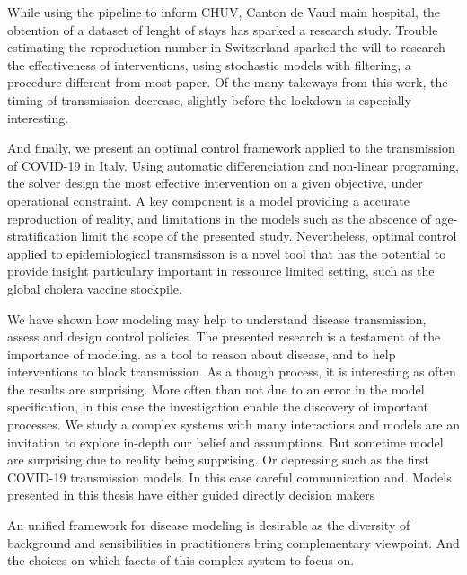 While using the pipeline to inform CHUV, Canton de Vaud main hospital, the obtention of a dataset of lenght of stays has sparked a research study. Trouble estimating the reproduction number in Switzerland sparked the will to research the effectiveness of interventions, using stochastic models with filtering, a procedure different from most paper. Of the many takeways from this work, the timing of transmission decrease, slightly before the lockdown is especially interesting.

And finally, we present an optimal control framework applied to the transmission of COVID-19 in Italy. Using automatic differenciation and non-linear programing, the solver design the most effective intervention on a given objective, under operational constraint. A key component is a model providing a accurate reproduction of reality, and limitations in the models such as the abscence of age-stratification limit the scope of the presented study. Nevertheless, optimal control applied to epidemiological transmsisson is a novel tool that has the potential to provide insight particulary important in ressource limited setting, such as the global cholera vaccine stockpile.

We have shown how modeling may help to understand disease transmission, assess and design control policies.
 The presented research is a testament of the importance of modeling. as a tool to reason about disease, and to help interventions to block transmission. As a though process, it is interesting as often the results are surprising. More often than not due to an error in the model specification, in this case the investigation enable the discovery of important processes. We study a complex systems with many interactions and models are an invitation to explore in-depth our belief and assumptions. But sometime model are surprising due to reality being supprising. Or depressing such as the first COVID-19 transmission models. In this case careful communication and. Models presented in this thesis have either guided directly decision makers
 
An unified framework for disease modeling is desirable as the diversity of background and sensibilities in practitioners bring complementary viewpoint. And the choices on which facets of this complex system to focus on. 

